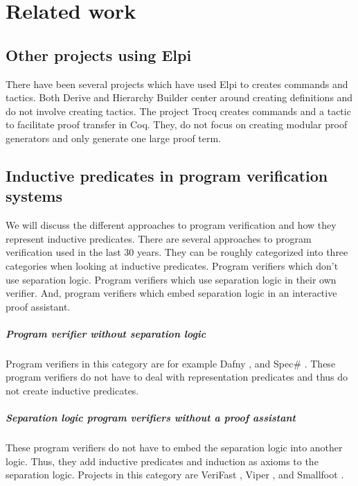 \documentclass[thesis.tex]{subfiles}
\begin{document}
\VerbatimFootnotes

\chapter{Related work} \label{ch:relatedwork}

\section{Other projects using Elpi}
There have been several projects which have used Elpi to creates commands and tactics. Both Derive \cite{tassiDerivingProvedEquality2019} and Hierarchy Builder \cite{cohenHierarchyBuilderAlgebraic2020} center around creating definitions and do not involve creating tactics. The project Trocq \cite{cohenTrocqProofTransfer2024} creates commands and a tactic to facilitate proof transfer in Coq. They, do not focus on creating modular proof generators and only generate one large proof term.

\section{Inductive predicates in program verification systems}
We will discuss the different approaches to program verification and how they represent inductive predicates.
There are several approaches to program verification used in the last 30 years. They can be roughly categorized into three categories when looking at inductive predicates. Program verifiers which don't use separation logic. Program verifiers which use separation logic in their own verifier. And, program verifiers which embed separation logic in an interactive proof assistant.

\paragraph{Program verifier without separation logic}
Program verifiers in this category are for example Dafny \cite{leinoDafnyAutomaticProgram2010}, and Spec\# \cite{barnettSpecProgrammingSystem2004,leinoUsingSpecLanguage2010}. These program verifiers do not have to deal with representation predicates and thus do not create inductive predicates.

\paragraph{Separation logic program verifiers without a proof assistant}
These program verifiers do not have to embed the separation logic into another logic. Thus, they add inductive predicates and induction as axioms to the separation logic. Projects in this category are VeriFast \cite{jacobsVeriFastPowerfulSound2011}, Viper \cite{mullerViperVerificationInfrastructure2016,summersAutomatingDeductiveVerification2018}, and Smallfoot \cite{berdineSmallfootModularAutomatic2005}.
\end{document}
